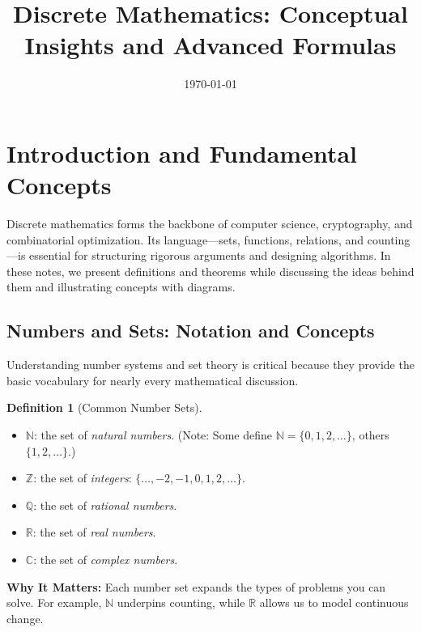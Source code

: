 \documentclass[12pt]{article}
\theoremstyle{definition}
\newtheorem{definition}[theorem]{Definition}
\begin{document}
\title{Discrete Mathematics: Conceptual Insights and Advanced Formulas}
\author{}
\date{\today}
\maketitle

\tableofcontents

\section{Introduction and Fundamental Concepts}

Discrete mathematics forms the backbone of computer science, cryptography, and combinatorial optimization. Its language—sets, functions, relations, and counting—is essential for structuring rigorous arguments and designing algorithms. In these notes, we present definitions and theorems while discussing the ideas behind them and illustrating concepts with diagrams.

\subsection{Numbers and Sets: Notation and Concepts}

Understanding number systems and set theory is critical because they provide the basic vocabulary for nearly every mathematical discussion.

\begin{definition}[Common Number Sets]
  \begin{itemize}[itemsep=3pt]
    \item \(\mathbb{N}\): the set of \emph{natural numbers}. (Note: Some define \(\mathbb{N}=\{0,1,2,\dots\}\), others \(\{1,2,\dots\}\).)
    \item \(\mathbb{Z}\): the set of \emph{integers}: \(\{ \dots, -2, -1, 0, 1, 2, \dots \}\).
    \item \(\mathbb{Q}\): the set of \emph{rational numbers}.
    \item \(\mathbb{R}\): the set of \emph{real numbers}.
    \item \(\mathbb{C}\): the set of \emph{complex numbers}.
  \end{itemize}
  \vspace{0.5em}
  \textbf{Why It Matters:} Each number set expands the types of problems you can solve. For example, \(\mathbb{N}\) underpins counting, while \(\mathbb{R}\) allows us to model continuous change.
\end{definition}
\end{document}
